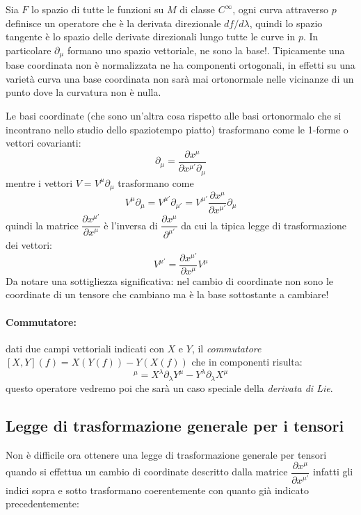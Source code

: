 \documentclass[twoside]{article}
\begin{document}
Sia $F$ lo spazio di tutte le funzioni su $M$ di classe $C^\infty$, ogni curva attraverso $p$ definisce un operatore che è la derivata direzionale $df/d\lambda$, quindi lo spazio tangente è lo spazio delle derivate direzionali lungo tutte le curve in $p$. In particolare $\partial_\mu$ formano uno spazio vettoriale, ne sono la base!. Tipicamente una base coordinata non è normalizzata ne ha componenti ortogonali, in effetti su una varietà curva una base coordinata non sarà mai ortonormale nelle vicinanze di un punto dove la curvatura non è nulla.

Le basi coordinate (che sono un'altra cosa rispetto alle basi ortonormalo che si incontrano nello studio dello spaziotempo piatto) trasformano come le 1-forme o vettori covarianti:
\begin{equation}
 \partial_{\mu} = \dfrac{\partial x^\mu}{\partial x^{\mu'}\partial_{\mu}}
\end{equation}
mentre i vettori $V=V^\mu \partial_{\mu}$ trasformano come 
\begin{equation}
 V^{\mu}\partial_\mu = V^{\mu'}\partial_{\mu'} = V^{\mu'} \dfrac{\partial x^\mu}{\partial x^{\mu'}}\partial_\mu
\end{equation}
quindi la matrice $\dfrac{\partial x^{\mu'}}{\partial x^\mu}$ è l'inversa di $\dfrac{\partial x^\mu}{\partial^{\mu'}}$ da cui la tipica legge di trasformazione dei vettori:
\begin{equation}
	V^{\mu'} = \dfrac{\partial x^{\mu'}}{\partial x^\mu}V^{\mu}
\end{equation}
Da notare una sottigliezza significativa: nel cambio di coordinate non sono le coordinate di un tensore che cambiano ma è la base sottostante a cambiare!
\paragraph{Commutatore: } dati due campi vettoriali indicati con $X$ e $Y$, il \emph{commutatore} $[X,Y](f)=X(Y(f))-Y(X(f))$ che in componenti risulta:
\begin{equation}
	[X,Y]^\mu = X^{\lambda}\partial_\lambda Y^{\mu} - Y^\lambda\partial_\lambda X^\mu
\end{equation}
questo operatore vedremo poi che sarà un caso speciale della \emph{derivata di Lie}.
\subsection{Legge di trasformazione generale per i tensori}
Non è difficile ora ottenere una legge di trasformazione generale per tensori quando si effettua un cambio di coordinate descritto dalla matrice $\dfrac{\partial x^\mu}{\partial x^{\mu'}}$ infatti gli indici sopra e sotto trasformano coerentemente con quanto già indicato precedentemente:
\end{document}

